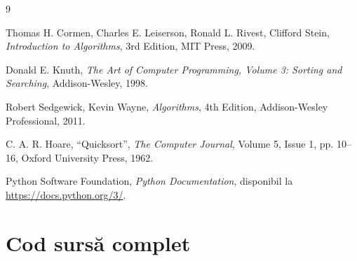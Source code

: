 \documentclass[a4paper,12pt]{article}
\begin{document}
\newpage
\begin{thebibliography}{9}

Thomas H. Cormen, Charles E. Leiserson, Ronald L. Rivest, Clifford Stein, \textit{Introduction to Algorithms}, 3rd Edition, MIT Press, 2009.

Donald E. Knuth, \textit{The Art of Computer Programming, Volume 3: Sorting and Searching}, Addison-Wesley, 1998.

Robert Sedgewick, Kevin Wayne, \textit{Algorithms}, 4th Edition, Addison-Wesley Professional, 2011.

C. A. R. Hoare, ``Quicksort'', \textit{The Computer Journal}, Volume 5, Issue 1, pp. 10--16, Oxford University Press, 1962.

Python Software Foundation, \textit{Python Documentation}, disponibil la \url{https://docs.python.org/3/}.

\end{thebibliography}

\newpage
\appendix

\section{Cod sursă complet}
\end{document}

